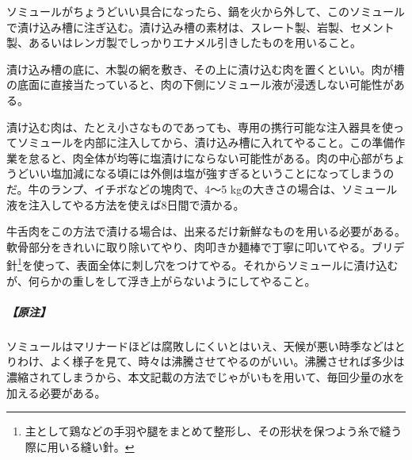 \begin{recette}
ソミュールがちょうどいい具合になったら、鍋を火から外して、このソミュールで漬け込み槽に注ぎ込む。漬け込み槽の素材は、スレート製、岩製、セメント製、あるいはレンガ製でしっかりエナメル引きしたものを用いること。

漬け込み槽の底に、木製の網を敷き、その上に漬け込む肉を置くといい。肉が槽の底面に直接当たっていると、肉の下側にソミュール液が浸透しない可能性がある。

漬け込む肉は、たとえ小さなものであっても、専用の携行可能な注入器具を使ってソミュールを内部に注入してから、漬け込み槽に入れてやること。この準備作業を怠ると、肉全体が均等に塩漬けにならない可能性がある。肉の中心部がちょうどいい塩加減になる頃には外側は塩が強すぎるということになってしまうのだ。牛のランプ、イチボなどの塊肉で、4〜5
kgの大きさの場合は、ソミュール液を注入してやる方法を使えば8日間で漬かる。

牛舌肉をこの方法で漬ける場合は、出来るだけ新鮮なものを用いる必要がある。軟骨部分をきれいに取り除いてやり、肉叩きか麺棒で丁寧に叩いてやる。ブリデ針\footnote{主として鶏などの手羽や腿をまとめて整形し、その形状を保つよう糸で縫う際に用いる縫い針。}を使って、表面全体に刺し穴をつけてやる。それからソミュールに漬け込むが、何らかの重しをして浮き上がらないようにしてやること。

\hypertarget{observation-grande-saumure}{%
\subparagraph{【原注】}\label{observation-grande-saumure}}

ソミュールはマリナードほどは腐敗しにくいとはいえ、天候が悪い時季などはとりわけ、よく様子を見て、時々は沸騰させてやるのがいい。沸騰させれば多少は濃縮されてしまうから、本文記載の方法でじゃがいもを用いて、毎回少量の水を加える必要がある。
\end{recette}